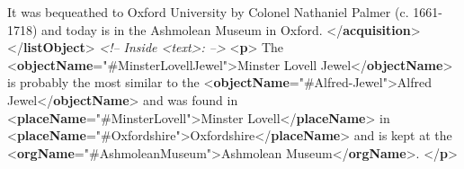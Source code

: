 \begin{shaded}
\hspace*{1em}\hspace*{1em} It was bequeathed to Oxford University by Colonel Nathaniel Palmer (c. 1661-1718) and today is in\mbox{}\newline 
\hspace*{1em}\hspace*{1em}\hspace*{1em}\hspace*{1em}\hspace*{1em}\hspace*{1em} the Ashmolean Museum in Oxford. {</\textbf{acquisition}>}\mbox{}\newline 
\hspace*{1em}\mbox{}\newline 
{}\mbox{}\newline 
{</\textbf{listObject}>}\mbox{}\newline 
\textit{<!-- Inside <text>: -->}\mbox{}\newline 
{<\textbf{p}>} The {<\textbf{objectName}\hspace*{1em}{ref}="{\#MinsterLovellJewel}">}Minster Lovell Jewel{</\textbf{objectName}>} is probably the most similar to the\mbox{}\newline 
{<\textbf{objectName}\hspace*{1em}{ref}="{\#Alfred-Jewel}">}Alfred Jewel{</\textbf{objectName}>} and was found in {<\textbf{placeName}\hspace*{1em}{ref}="{\#MinsterLovell}">}Minster\mbox{}\newline 
\hspace*{1em}\hspace*{1em} Lovell{</\textbf{placeName}>} in {<\textbf{placeName}\hspace*{1em}{ref}="{\#Oxfordshire}">}Oxfordshire{</\textbf{placeName}>} and is kept at the {<\textbf{orgName}\hspace*{1em}{ref}="{\#AshmoleanMuseum}">}Ashmolean Museum{</\textbf{orgName}>}.\mbox{}\newline 
{</\textbf{p}>}\end{shaded}\egroup\par \par
